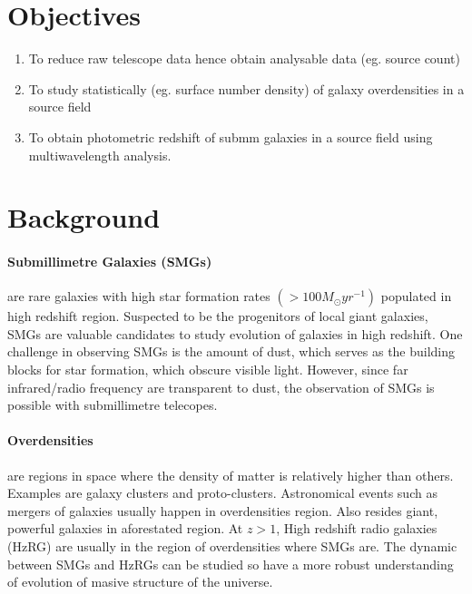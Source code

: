 \documentclass{article}
\begin{document}
\section{Objectives}
\begin{enumerate}
    \item To reduce raw telescope data hence obtain analysable data (eg. source count)
    \item To study statistically (eg. surface number density) of galaxy overdensities in a source field
    \item To obtain photometric redshift of submm galaxies in a source field using multiwavelength analysis.
\end{enumerate}
\section{Background}

\paragraph{Submillimetre Galaxies (SMGs)}are rare galaxies with high star formation rates $(>100M_\odot yr^{-1})$ \cite{DaCunha2021} populated in high redshift region. Suspected to be the progenitors of local giant galaxies, SMGs are valuable candidates to study evolution of galaxies in high redshift. One challenge in observing SMGs is the amount of dust, which serves as the building blocks for star formation, which obscure visible light. However, since far infrared/radio frequency are transparent to dust, the observation of SMGs is possible with submillimetre telecopes. 

\paragraph{Overdensities}are regions in space where the density of matter is relatively higher than others. Examples are galaxy clusters and proto-clusters. Astronomical events such as mergers of galaxies usually happen in overdensities region. Also resides giant, powerful galaxies in aforestated region. At $z>1$, High redshift radio galaxies (HzRG) are usually in the region of overdensities where SMGs are. The dynamic between SMGs and HzRGs can be studied so have a more robust understanding of evolution of masive structure of the universe.\cite{Saxena2018}
\end{document}
